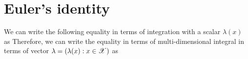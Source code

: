 \documentclass[letterpaper,english,10pt]{article}
\begin{document}
\section{Euler's identity}
\begin{thm}
We can write the following equality in terms of integration with a scalar $\lambda(x)$ as 
Therefore, we can write the equality in terms of multi-dimensional integral in terms of vector $\lambda = (\lambda(x): x \in \mathscr{X})$ as 
\end{thm}
\end{document}
